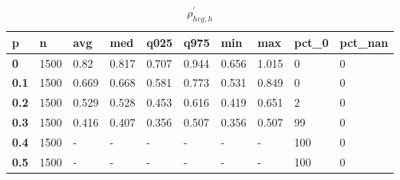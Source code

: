 \begin{table}[h]
 \centering 
\footnotesize
\caption{$\rho_{hcg,h}^\prime $}
\label{tab:alphahcgh}
\begin{tabular}[h]{|l|l|l|l|l|l|l|l|l|l|
    } \hline
\textbf{ p} & \textbf{ n} & \textbf{ avg} & \textbf{ med} & \textbf{ q025} & \textbf{ q975} & \textbf{ min} & \textbf{ max} & \textbf{ pct\_0} & \textbf{ pct\_nan}
    \\ \hline
  \textbf{  0} & 1500 &  0.82 & 0.817 & 0.707 & 0.944 & 0.656 & 1.015 &   0 & 0
    \\ \hline
  \textbf{0.1} & 1500 & 0.669 & 0.668 & 0.581 & 0.773 & 0.531 & 0.849 &   0 & 0
    \\ \hline
  \textbf{0.2} & 1500 & 0.529 & 0.528 & 0.453 & 0.616 & 0.419 & 0.651 &   2 & 0
    \\ \hline
  \textbf{0.3} & 1500 & 0.416 & 0.407 & 0.356 & 0.507 & 0.356 & 0.507 &  99 & 0
    \\ \hline
  \textbf{0.4} & 1500 & - & - & - & - & - & - & 100 & 0
    \\ \hline
  \textbf{0.5} & 1500 & - & - & - & - & - & - & 100 & 0
    \\ \hline
 \end{tabular}
 \end{table}
